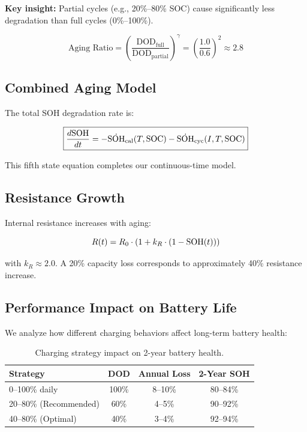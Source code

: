 \textbf{Key insight:} Partial cycles (e.g., 20\%--80\% SOC) cause significantly less degradation than full cycles (0\%--100\%).

\begin{equation}
    \text{Aging Ratio} = \left(\frac{\text{DOD}_{\text{full}}}{\text{DOD}_{\text{partial}}}\right)^{\gamma} = \left(\frac{1.0}{0.6}\right)^{2} \approx 2.8
\end{equation}

\subsection{Combined Aging Model}
\label{subsec:combined_aging}

The total SOH degradation rate is:

\begin{equation}
    \boxed{\frac{d\text{SOH}}{dt} = -\dot{\text{SOH}}_{\text{cal}}(T, \text{SOC}) - \dot{\text{SOH}}_{\text{cyc}}(I, T, \text{SOC})}
    \label{eq:total_aging}
\end{equation}

This fifth state equation completes our continuous-time model.

\subsection{Resistance Growth}
\label{subsec:resistance_growth}

Internal resistance increases with aging:

\begin{equation}
    R(t) = R_0 \cdot \left(1 + k_R \cdot (1 - \text{SOH}(t))\right)
    \label{eq:resistance_growth}
\end{equation}

with $k_R \approx 2.0$. A 20\% capacity loss corresponds to approximately 40\% resistance increase.

\subsection{Performance Impact on Battery Life}
\label{subsec:performance_impact}

We analyze how different charging behaviors affect long-term battery health:

\begin{table}[H]
    \centering
    \caption{Charging strategy impact on 2-year battery health.}
    \label{tab:charging_impact}
    \begin{tabular}{lccc}
        \toprule
        \textbf{Strategy} & \textbf{DOD} & \textbf{Annual Loss} & \textbf{2-Year SOH} \\
        \midrule
        0--100\% daily & 100\% & 8--10\% & 80--84\% \\
        20--80\% (Recommended) & 60\% & 4--5\% & 90--92\% \\
        40--80\% (Optimal) & 40\% & 3--4\% & 92--94\% \\
        \bottomrule
    \end{tabular}
\end{table}

